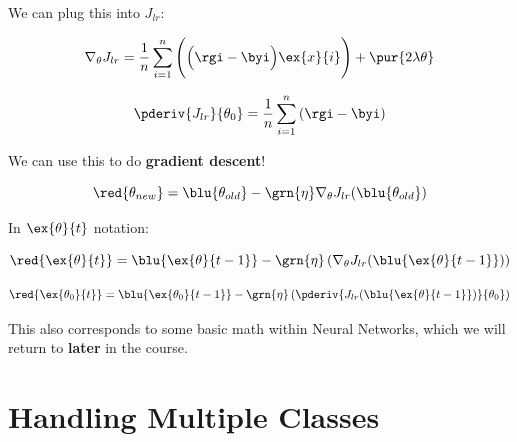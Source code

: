         We can plug this into $J_{lr}$:
        
        \begin{equation}
            \nabla_\theta J_{lr} 
            =
            \frac{1}{n} \sum_{i=1}^{n }
            \Bigg(
                \Big(\rgi - \byi \Big) \ex{x}{i}
            \Bigg)
            +
            \pur{ 2 \lambda \theta }
        \end{equation}
        
        \begin{equation}
            \pderiv{J_{lr}}{\theta_0}
            =
            \frac{1}{n} \sum_{i=1}^{n } \left( \rgi - \byi \right)
        \end{equation}
        
        We can use this to do \textbf{gradient descent}!
        
        \begin{equation}
            \red{ \theta_{new} } = \blu{ \theta_{old} } - \grn{\eta} \nabla_\theta J_{lr} (\blu{ \theta_{old} })
        \end{equation}
        
        In $\ex{\theta}{t}$ notation:
        
        \begin{equation}
            \red{ \ex{\theta}{t} } = \blu{ \ex{\theta}{t-1} } - \grn{\eta} 
            \left(
            \nabla_\theta J_{lr} (\blu{ \ex{\theta}{t-1} })
            \right)
        \end{equation}
        
        \begin{equation}
            \red{ \ex{\theta_0}{t} } = \blu{ \ex{\theta_0}{t-1} } - \grn{\eta} 
            \left(
                \pderiv{ J_{lr} (\blu{ \ex{\theta}{t-1} })}{\theta_0}
            \right)
        \end{equation}
        
        This also corresponds to some basic math within Neural Networks, which we will return to \textbf{later} in the course.

\pagebreak

\section{Handling Multiple Classes}

